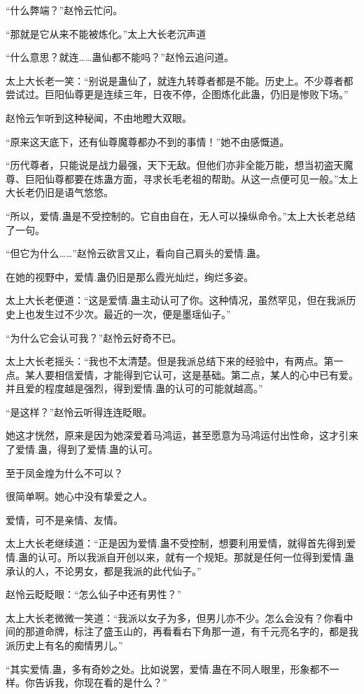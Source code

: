 \begin{this_body}
“什么弊端？”赵怜云忙问。

“那就是它从来不能被炼化。”太上大长老沉声道

“什么意思？就连……蛊仙都不能吗？”赵怜云追问道。

太上大长老一笑：“别说是蛊仙了，就连九转尊者都是不能。历史上。不少尊者都尝试过。巨阳仙尊更是连续三年，日夜不停，企图炼化此蛊，仍旧是惨败下场。”

赵怜云乍听到这种秘闻，不由地瞪大双眼。

“原来这天底下，还有仙尊魔尊都办不到的事情！”她不由感慨道。

“历代尊者，只能说是战力最强，天下无敌。但他们亦非全能万能，想当初盗天魔尊、巨阳仙尊都要在炼蛊方面，寻求长毛老祖的帮助。从这一点便可见一般。”太上大长老仍旧是语气悠悠。

“所以，爱情.蛊是不受控制的。它自由自在，无人可以操纵命令。”太上大长老总结了一句。

“但它为什么……”赵怜云欲言又止，看向自己肩头的爱情.蛊。

在她的视野中，爱情.蛊仍旧是那么霞光灿烂，绚烂多姿。

太上大长老便道：“这是爱情.蛊主动认可了你。这种情况，虽然罕见，但在我派历史上也发生过不少次。最近的一次，便是墨瑶仙子。”

“为什么它会认可我？”赵怜云好奇不已。

太上大长老摇头：“我也不太清楚。但是我派总结下来的经验中，有两点。第一点。某人要相信爱情，才能得到它认可，这是基础。第二点，某人的心中已有爱。并且爱的程度越是强烈，得到爱情.蛊的认可的可能就越高。”

“是这样？”赵怜云听得连连眨眼。

她这才恍然，原来是因为她深爱着马鸿运，甚至愿意为马鸿运付出性命，这才引来了爱情.蛊，得到了爱情.蛊的认可。

至于凤金煌为什么不可以？

很简单啊。她心中没有挚爱之人。

爱情，可不是亲情、友情。

太上大长老继续道：“正是因为爱情.蛊不受控制，想要利用爱情，就得首先得到爱情.蛊的认可。所以我派自开创以来，就有一个规矩。那就是任何一位得到爱情.蛊承认的人，不论男女，都是我派的此代仙子。”

赵怜云眨眨眼：“怎么仙子中还有男性？”

太上大长老微微一笑道：“我派以女子为多，但男儿亦不少。怎么会没有？你看中间的那道命牌，标注了盛玉山的，再看看右下角那一道，有千元亮名字的，都是我派历史上有名的痴情男儿。”

“其实爱情.蛊，多有奇妙之处。比如说罢，爱情.蛊在不同人眼里，形象都不一样。你告诉我，你现在看的是什么？”


\end{this_body}
